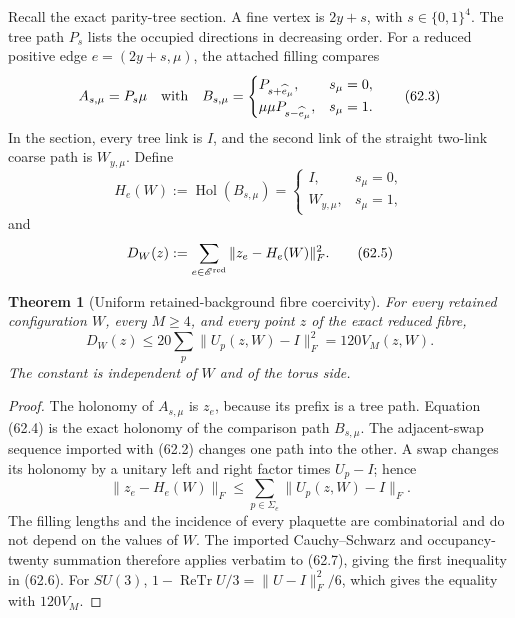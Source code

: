 \documentclass[11pt,oneside]{book}
\newtheorem{theorem}{Theorem}[chapter]
\theoremstyle{definition}
\theoremstyle{remark}
\begin{document}
Recall the exact parity-tree section.  A fine vertex is
\(2y+s\), with \(s\in\{0,1\}^4\).  The tree path \(P_s\) lists the
occupied directions in decreasing order.  For a reduced positive
edge \(e=(2y+s,\mu)\), the attached filling compares
\[
 A_{s,\mu}=P_s\mu
 \quad\hbox{with}\quad
 B_{s,\mu}=\begin{cases}
 P_{s+\widehat e_\mu},&s_\mu=0,\\
 \mu\mu P_{s-\widehat e_\mu},&s_\mu=1.
 \end{cases}                                                  \tag{62.3}
\]
In the section, every tree link is \(I\), and the second link of
the straight two-link coarse path is \(W_{y,\mu}\).  Define
\[
 H_e(W):=\operatorname{Hol}(B_{s,\mu})
 =\begin{cases}
 I,&s_\mu=0,\\
 W_{y,\mu},&s_\mu=1,
 \end{cases}                                                  \tag{62.4}
\]
and
\[
 D_W(z):=\sum_{e\in{\mathscr E}^{\rm red}}
          \|z_e-H_e(W)\|_F^2.                                \tag{62.5}
\]

\begin{theorem}[Uniform retained-background fibre coercivity]
\label{thm:e8v62-moving-coercivity}
For every retained configuration \(W\), every \(M\ge4\), and every
point \(z\) of the exact reduced fibre,
\[
 \boxed{D_W(z)\le20\sum_p\|U_p(z,W)-I\|_F^2
                   =120V_M(z,W).}                            \tag{62.6}
\]
The constant is independent of \(W\) and of the torus side.
\end{theorem}

\begin{proof}
The holonomy of \(A_{s,\mu}\) is \(z_e\), because its prefix is a
tree path.  Equation (62.4) is the exact holonomy of the comparison
path \(B_{s,\mu}\).  The adjacent-swap sequence imported with
(62.2) changes one path into the other.  A swap changes its holonomy
by a unitary left and right factor times \(U_p-I\); hence
\[
 \|z_e-H_e(W)\|_F
 \le\sum_{p\in\Sigma_e}\|U_p(z,W)-I\|_F.                    \tag{62.7}
\]
The filling lengths and the incidence of every plaquette are
combinatorial and do not depend on the values of \(W\).  The
imported Cauchy--Schwarz and occupancy-twenty summation therefore
applies verbatim to (62.7), giving the first inequality in (62.6).
For \(SU(3)\),
\(1-\operatorname{ReTr}U/3=\|U-I\|_F^2/6\), which gives the
equality with \(120V_M\).
\end{proof}
\end{document}
